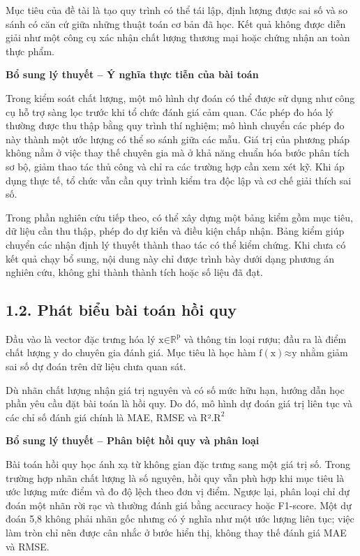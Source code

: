 \documentclass[12pt,a4paper,oneside]{article}
\begin{document}
Mục tiêu của đề tài là tạo quy trình có thể tái lập, định lượng được sai
số và so sánh có căn cứ giữa những thuật toán cơ bản đã học. Kết quả
không được diễn giải như một công cụ xác nhận chất lượng thương mại hoặc
chứng nhận an toàn thực phẩm.


\par\noindent\textbf{Bổ sung lý thuyết -- Ý nghĩa thực tiễn của bài toán}\par
Trong kiểm soát chất lượng, một mô hình dự đoán có thể được sử dụng như công cụ hỗ trợ sàng lọc trước khi tổ chức đánh giá cảm quan. Các phép đo hóa lý thường được thu thập bằng quy trình thí nghiệm; mô hình chuyển các phép đo này thành một ước lượng có thể so sánh giữa các mẫu. Giá trị của phương pháp không nằm ở việc thay thế chuyên gia mà ở khả năng chuẩn hóa bước phân tích sơ bộ, giảm thao tác thủ công và chỉ ra các trường hợp cần xem xét kỹ. Khi áp dụng thực tế, tổ chức vẫn cần quy trình kiểm tra độc lập và cơ chế giải thích sai số.\par

Trong phần nghiên cứu tiếp theo, có thể xây dựng một bảng kiểm gồm mục tiêu, dữ liệu cần thu thập, phép đo dự kiến và điều kiện chấp nhận. Bảng kiểm giúp chuyển các nhận định lý thuyết thành thao tác có thể kiểm chứng. Khi chưa có kết quả chạy bổ sung, nội dung này chỉ được trình bày dưới dạng phương án nghiên cứu, không ghi thành thành tích hoặc số liệu đã đạt.\par

\subsection*{1.2. Phát biểu bài toán hồi quy}

Đầu vào là vector đặc trưng hóa lý
\(\text{x}\text{∈}\text{ℝ}^{\text{p}}\) và thông tin loại rượu; đầu ra
là điểm chất lượng \(\text{y}\) do chuyên gia đánh giá. Mục tiêu là học
hàm \(\text{f}\left( \text{x} \right)\text{≈}\text{y}\) nhằm giảm sai số
dự đoán trên dữ liệu chưa quan sát.

Dù nhãn chất lượng nhận giá trị nguyên và có số mức hữu hạn, hướng dẫn
học phần yêu cầu đặt bài toán là hồi quy. Do đó, mô hình dự đoán giá trị
liên tục và các chỉ số đánh giá chính là MAE, RMSE và
R².\(\text{R}^{\text{2}}\)


\par\noindent\textbf{Bổ sung lý thuyết -- Phân biệt hồi quy và phân loại}\par
Bài toán hồi quy học ánh xạ từ không gian đặc trưng sang một giá trị số. Trong trường hợp nhãn chất lượng là số nguyên, hồi quy vẫn phù hợp khi mục tiêu là ước lượng mức điểm và đo độ lệch theo đơn vị điểm. Ngược lại, phân loại chỉ dự đoán một nhãn rời rạc và thường đánh giá bằng accuracy hoặc F1-score. Một dự đoán 5,8 không phải nhãn gốc nhưng có ý nghĩa như một ước lượng liên tục; việc làm tròn chỉ nên được cân nhắc ở bước hiển thị, không thay thế đánh giá MAE và RMSE.\par
\end{document}
